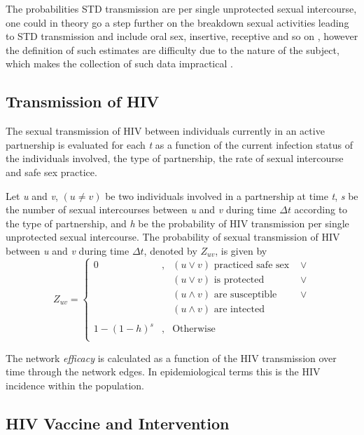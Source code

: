 The probabilities STD transmission are per single unprotected sexual intercourse, one
could in theory go a step further on the breakdown sexual activities leading to STD
transmission and include oral sex, insertive, receptive and so on \cite{Donovan2000},
however the definition of such estimates are difficulty due to the nature of the subject,
which makes the collection of such data impractical \cite{Mastro1994}.

\subsection{Transmission of HIV}
The sexual transmission of HIV between individuals currently in an active partnership is
evaluated for each \emph{t} as a function of the current infection status of the
individuals involved, the type of partnership, the rate of sexual intercourse and safe
sex practice.

Let \emph{u} and \emph{v}, $(u \neq v)$ be two individuals involved in a partnership at
time \emph{t}, \emph{s} be the number of sexual intercourses between \emph{u} and
\emph{v} during time $\Delta t$ according to the type of partnership, and \emph{h} be the
probability of HIV transmission per single unprotected sexual intercourse. The
probability of sexual transmission of HIV between \emph{u} and \emph{v} during time
$\Delta t$, denoted by $Z_{uv}$, is given by
\begin{equation}\label{probhiv}
Z_{uv} = \left\{
    \begin{array}{lcll}
      0             &, & (u \vee v) \textrm{ practiced safe sex }& \vee \\
                    &  & (u \vee v) \textrm{ is protected }      & \vee \\
                    &  & (u \wedge v) \textrm{ are susceptible } & \vee \\
                    &  & (u \wedge v) \textrm{ are intected }    &      \\
                    &  & & \\
      1 - (1-h)^s   &, & \textrm{Otherwise} & \\
    \end{array}\right.
\end{equation}

The network \emph{efficacy} is calculated as a function of the HIV transmission over time
through the network edges. In epidemiological terms this is the HIV incidence within the
population.

\subsection{HIV Vaccine and Intervention}

